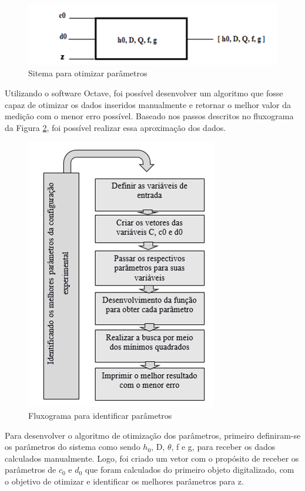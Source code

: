 \documentclass[a4paper, 12pt]{article}
\begin{document}
\begin{figure}[h!]
	\centering
		\includegraphics[width=.55\linewidth]{sitema_otimizacao.png}
	\caption{Sitema para otimizar parâmetros}
	\label{sitema_otimizacao}
\end{figure}

Utilizando o software Octave, foi possível desenvolver um algoritmo que fosse capaz de otimizar os dados inseridos manualmente e retornar o melhor valor da medição com o menor erro possível. Baseado nos passos descritos no fluxograma da Figura \ref{identificar parametros}, foi possível realizar essa aproximação dos dados.


\begin{figure}[h!]
	\centering
		\includegraphics[width=.55\linewidth]{fluxograma_identificar_parametros.png}
	\caption{Fluxograma para identificar parâmetros}
	\label{identificar parametros}
\end{figure}

Para desenvolver o algoritmo de otimização dos parâmetros, primeiro definiram-se os parâmetros do sistema como sendo $h_0$, D, $\theta$, f e g, para receber os dados calculados manualmente. Logo, foi criado um vetor com o propósito de receber os parâmetros de $c_0$ e $d_0$ que foram calculados do primeiro objeto digitalizado, com o objetivo de otimizar e identificar os melhores parâmetros para z.
\end{document}
